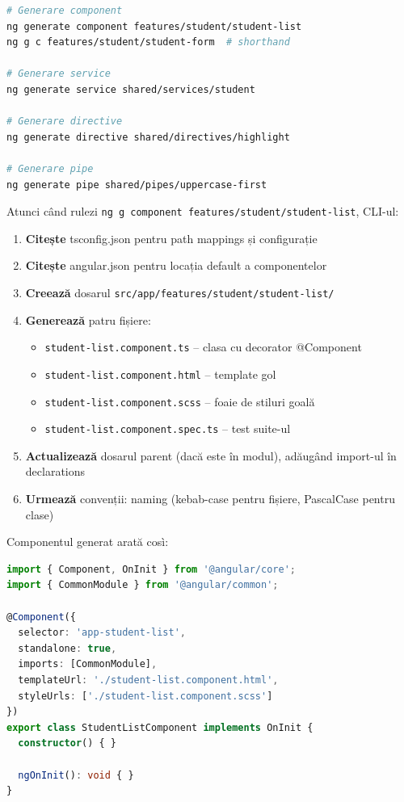 \begin{lstlisting}[language=bash]
# Generare component
ng generate component features/student/student-list
ng g c features/student/student-form  # shorthand

# Generare service
ng generate service shared/services/student

# Generare directive
ng generate directive shared/directives/highlight

# Generare pipe
ng generate pipe shared/pipes/uppercase-first
\end{lstlisting}

Atunci când rulezi \texttt{ng g component features/student/student-list}, CLI-ul:

\begin{enumerate}
  \item \textbf{Citește} tsconfig.json pentru path mappings și configurație
  \item \textbf{Citește} angular.json pentru locația default a componentelor
  \item \textbf{Creează} dosarul \texttt{src/app/features/student/student-list/}
  \item \textbf{Generează} patru fișiere:
  \begin{itemize}
    \item \texttt{student-list.component.ts} – clasa cu decorator @Component
    \item \texttt{student-list.component.html} – template gol
    \item \texttt{student-list.component.scss} – foaie de stiluri goală
    \item \texttt{student-list.component.spec.ts} – test suite-ul
  \end{itemize}
  \item \textbf{Actualizează} dosarul parent (dacă este în modul), adăugând import-ul în declarations
  \item \textbf{Urmează} convenții: naming (kebab-case pentru fișiere, PascalCase pentru clase)
\end{enumerate}

Componentul generat arată così:

\begin{lstlisting}[language=TypeScript]
import { Component, OnInit } from '@angular/core';
import { CommonModule } from '@angular/common';

@Component({
  selector: 'app-student-list',
  standalone: true,
  imports: [CommonModule],
  templateUrl: './student-list.component.html',
  styleUrls: ['./student-list.component.scss']
})
export class StudentListComponent implements OnInit {
  constructor() { }

  ngOnInit(): void { }
}
\end{lstlisting}

